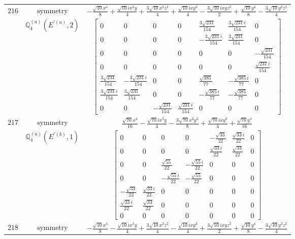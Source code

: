 \documentclass[fleqn,8pt,landscape]{jsarticle}
\begin{document}
\begin{longtable}{ccc}
$ 216 $ & $ \text{symmetry} $ & $ - \frac{\sqrt{10} x^{4}}{8} + \frac{\sqrt{10} i x^{3} y}{4} + \frac{3 \sqrt{10} x^{2} z^{2}}{4} + \frac{\sqrt{10} i x y^{3}}{4} - \frac{3 \sqrt{10} i x y z^{2}}{2} + \frac{\sqrt{10} y^{4}}{8} - \frac{3 \sqrt{10} y^{2} z^{2}}{4} $ \\
$  $ & $ \mathbb{Q}_{4}^{(a)}(E^{\prime(a)},2) $ & $ \begin{bmatrix} 0 & 0 & 0 & 0 & \frac{3 \sqrt{231}}{154} & \frac{3 \sqrt{231} i}{154} & 0 \\ 0 & 0 & 0 & 0 & - \frac{3 \sqrt{231} i}{154} & \frac{3 \sqrt{231}}{154} & 0 \\ 0 & 0 & 0 & 0 & 0 & 0 & - \frac{\sqrt{231}}{154} \\ 0 & 0 & 0 & 0 & 0 & 0 & \frac{\sqrt{231} i}{154} \\ \frac{3 \sqrt{231}}{154} & - \frac{3 \sqrt{231} i}{154} & 0 & 0 & \frac{\sqrt{385}}{77} & - \frac{\sqrt{385} i}{77} & 0 \\ \frac{3 \sqrt{231} i}{154} & \frac{3 \sqrt{231}}{154} & 0 & 0 & - \frac{\sqrt{385} i}{77} & - \frac{\sqrt{385}}{77} & 0 \\ 0 & 0 & - \frac{\sqrt{231}}{154} & \frac{\sqrt{231} i}{154} & 0 & 0 & 0 \end{bmatrix} $ \\ \hline
$ 217 $ & $ \text{symmetry} $ & $ \frac{\sqrt{70} x^{4}}{16} - \frac{\sqrt{70} i x^{3} y}{4} - \frac{3 \sqrt{70} x^{2} y^{2}}{8} + \frac{\sqrt{70} i x y^{3}}{4} + \frac{\sqrt{70} y^{4}}{16} $ \\
$  $ & $ \mathbb{Q}_{4}^{(a)}(E^{\prime(b)},1) $ & $ \begin{bmatrix} 0 & 0 & 0 & 0 & - \frac{\sqrt{33}}{22} & \frac{\sqrt{33} i}{22} & 0 \\ 0 & 0 & 0 & 0 & \frac{\sqrt{33} i}{22} & \frac{\sqrt{33}}{22} & 0 \\ 0 & 0 & \frac{\sqrt{55}}{22} & - \frac{\sqrt{55} i}{22} & 0 & 0 & 0 \\ 0 & 0 & - \frac{\sqrt{55} i}{22} & - \frac{\sqrt{55}}{22} & 0 & 0 & 0 \\ - \frac{\sqrt{33}}{22} & \frac{\sqrt{33} i}{22} & 0 & 0 & 0 & 0 & 0 \\ \frac{\sqrt{33} i}{22} & \frac{\sqrt{33}}{22} & 0 & 0 & 0 & 0 & 0 \\ 0 & 0 & 0 & 0 & 0 & 0 & 0 \end{bmatrix} $ \\ \hline
$ 218 $ & $ \text{symmetry} $ & $ - \frac{\sqrt{10} x^{4}}{8} - \frac{\sqrt{10} i x^{3} y}{4} + \frac{3 \sqrt{10} x^{2} z^{2}}{4} - \frac{\sqrt{10} i x y^{3}}{4} + \frac{3 \sqrt{10} i x y z^{2}}{2} + \frac{\sqrt{10} y^{4}}{8} - \frac{3 \sqrt{10} y^{2} z^{2}}{4} $ \\

\end{longtable}
\end{document}

